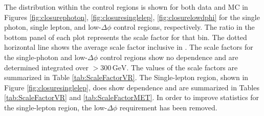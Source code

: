 The \ptmiss distribution within the control regions is shown for both data and MC in Figures \ref{fig:closurephoton}, \ref{fig:closuresinglelep}, \ref{fig:closurelowdphi} for the single photon, single lepton, and low-$\Delta\phi$ control regions, respectively. The ratio in the bottom panel of each plot represents the scale factor for that \ptmiss bin. The dotted horizontal line shows the average scale factor inclusive in \ptmiss. The scale factors for the single-photon and low-$\Delta\phi$ control regions show no \ptmiss dependence and are determined integrated over \ptmiss$>300\,\textrm{GeV}$. The values of the scale factors are summarized in Table \ref{tab:ScaleFactorVR}. The Single-lepton region, shown in Figure \ref{fig:closuresinglelep}, does show \ptmiss dependence and are summarized in Tables \ref{tab:ScaleFactorVR} and \ref{tab:ScaleFactorMET}.  In order to improve statistics for the single-lepton region, the low-$\Delta\phi$ requirement has been removed.

